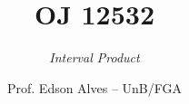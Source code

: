 \title{OJ 12532}
\subtitle{\textit{Interval Product}}
\author{Prof. Edson Alves -- UnB/FGA}
\date{}
